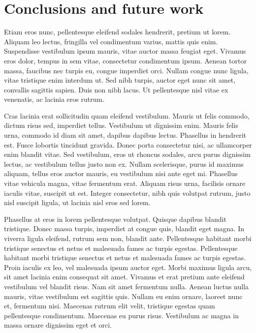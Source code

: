 \documentclass[final,5p,times,twocolumn]{elsarticle}
\begin{document}
\section{Conclusions and future work}
\label{sec:cf}

Etiam eros nunc, pellentesque eleifend sodales hendrerit, pretium ut lorem. Aliquam leo lectus, fringilla vel condimentum varius, mattis quis enim. Suspendisse vestibulum ipsum mauris, vitae auctor massa feugiat eget. Vivamus eros dolor, tempus in sem vitae, consectetur condimentum ipsum. Aenean tortor massa, faucibus nec turpis eu, congue imperdiet orci. Nullam congue nunc ligula, vitae tristique enim interdum ut. Sed nibh turpis, auctor eget nunc sit amet, convallis sagittis sapien. Duis non nibh lacus. Ut pellentesque nisl vitae ex venenatis, ac lacinia eros rutrum.

Cras lacinia erat sollicitudin quam eleifend vestibulum. Mauris ut felis commodo, dictum risus sed, imperdiet tellus. Vestibulum ut dignissim enim. Mauris felis urna, commodo id diam sit amet, dapibus dapibus lectus. Phasellus in hendrerit est. Fusce lobortis tincidunt gravida. Donec porta consectetur nisi, ac ullamcorper enim blandit vitae. Sed vestibulum, eros ut rhoncus sodales, arcu purus dignissim lectus, ac vestibulum tellus justo non ex. Nullam scelerisque, purus id maximus aliquam, tellus eros auctor mauris, eu vestibulum nisi ante eget mi. Phasellus vitae vehicula magna, vitae fermentum erat. Aliquam risus urna, facilisis ornare iaculis vitae, suscipit ut est. Integer consectetur, nibh quis volutpat rutrum, justo nisl suscipit ligula, ut lacinia nisl eros sed lorem.

Phasellus at eros in lorem pellentesque volutpat. Quisque dapibus blandit tristique. Donec massa turpis, imperdiet at congue quis, blandit eget magna. In viverra ligula eleifend, rutrum sem non, blandit ante. Pellentesque habitant morbi tristique senectus et netus et malesuada fames ac turpis egestas. Pellentesque habitant morbi tristique senectus et netus et malesuada fames ac turpis egestas. Proin iaculis ex leo, vel malesuada ipsum auctor eget. Morbi maximus ligula arcu, sit amet lacinia enim consequat sit amet. Vivamus et erat pretium ante eleifend vestibulum vel blandit risus. Nam sit amet fermentum nulla. Aenean luctus nulla mauris, vitae vestibulum est sagittis quis. Nullam eu enim ornare, laoreet nunc et, fermentum nisi. Maecenas rutrum elit velit, tristique egestas quam pellentesque condimentum. Maecenas eu purus risus. Vestibulum ac magna in massa ornare dignissim eget et orci.



\end{document}
